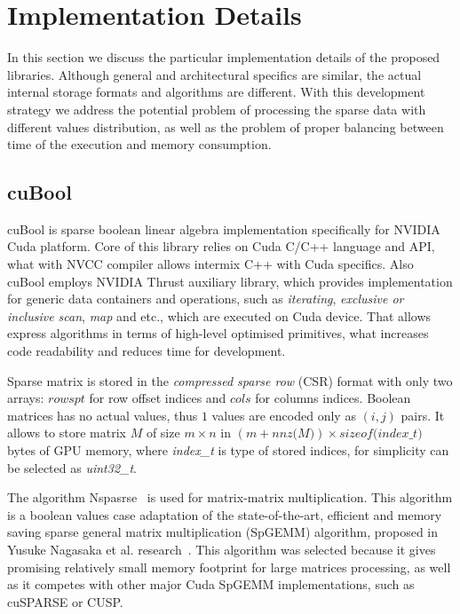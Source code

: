 \section{Implementation Details}

In this section we discuss the particular implementation details of the proposed libraries. Although general and architectural specifics are similar, the actual internal storage formats and algorithms are different. With this development strategy we address the potential problem of processing the sparse data with different values distribution, as well as the problem of proper balancing between time of the execution and memory consumption. 

\subsection{cuBool}

cuBool is sparse boolean linear algebra implementation specifically for NVIDIA Cuda platform. Core of this 
library relies on Cuda C/C++ language and API, what with NVCC compiler allows intermix C++ with Cuda 
specifics. Also cuBool employs NVIDIA Thrust auxiliary library, which provides 
implementation for generic data containers and operations, such as \textit{iterating}, \textit{exclusive or 
inclusive scan}, \textit{map} and etc., which are executed on Cuda device. That allows express algorithms in 
terms of high-level optimised primitives, what increases code readability and reduces time for development.

Sparse matrix is stored in the \textit{compressed sparse row} (CSR) format with only two arrays: 
$rowspt$ for row offset indices and $cols$ for columns indices. Boolean matrices has no actual values, thus 
$1$ values are encoded only as $(i, j)$ pairs. It allows to store matrix $M$ of size $m \times n$ 
in $(m + \textit{nnz(M)}) \times \textit{sizeof(index\_t)}$ bytes of GPU memory, where 
\textit{index\_t} is type of stored indices, for simplicity can be selected as \textit{uint32\_t}.

The algorithm Nspasrse~\cite{inproceedings:cfpq_for_redis_graph} is used for matrix-matrix multiplication. 
This algorithm is a boolean values case adaptation of the state-of-the-art, efficient and memory saving sparse general matrix multiplication (SpGEMM) algorithm, proposed in Yusuke Nagasaka et al. research~\cite{algo:spgemm:8025284}. 
This algorithm was selected because it gives promising relatively small memory footprint for large matrices processing, as well as it competes with other major Cuda SpGEMM implementations, such as cuSPARSE or CUSP.  


